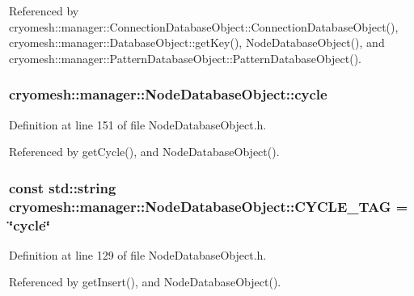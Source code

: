\-Referenced by cryomesh\-::manager\-::\-Connection\-Database\-Object\-::\-Connection\-Database\-Object(), cryomesh\-::manager\-::\-Database\-Object\-::get\-Key(), \-Node\-Database\-Object(), and cryomesh\-::manager\-::\-Pattern\-Database\-Object\-::\-Pattern\-Database\-Object().

\hypertarget{classcryomesh_1_1manager_1_1NodeDatabaseObject_a64c6887b55673bfb0dcd49919c2f21f8}{
\subsubsection[{cycle}]{ {\bf cryomesh\-::manager\-::\-Node\-Database\-Object\-::cycle}}}\label{classcryomesh_1_1manager_1_1NodeDatabaseObject_a64c6887b55673bfb0dcd49919c2f21f8}


\-Definition at line 151 of file \-Node\-Database\-Object.\-h.



\-Referenced by get\-Cycle(), and \-Node\-Database\-Object().

\hypertarget{classcryomesh_1_1manager_1_1NodeDatabaseObject_a27dbca85d042b1bf292de812e3da608c}{
\subsubsection[{\-C\-Y\-C\-L\-E\-\_\-\-T\-A\-G}]{\setlength{\rightskip}{0pt plus 5cm}const std\-::string {\bf cryomesh\-::manager\-::\-Node\-Database\-Object\-::\-C\-Y\-C\-L\-E\-\_\-\-T\-A\-G} = \char`\"{}cycle\char`\"{}}}\label{classcryomesh_1_1manager_1_1NodeDatabaseObject_a27dbca85d042b1bf292de812e3da608c}


\-Definition at line 129 of file \-Node\-Database\-Object.\-h.



\-Referenced by get\-Insert(), and \-Node\-Database\-Object().

